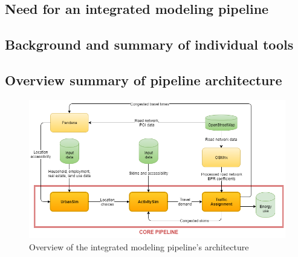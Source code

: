 \subsection{Need for an integrated modeling pipeline}




\subsection{Background and summary of individual tools}




\subsection{Overview summary of pipeline architecture}

\begin{figure}[ht]
    \center
    \includegraphics[width=\textwidth]
    {graphics/diagram_pipeline.png}
    \caption{Overview of the integrated modeling pipeline's architecture}
    \label{fig:overview_pipeline_architecture}
\end{figure}




